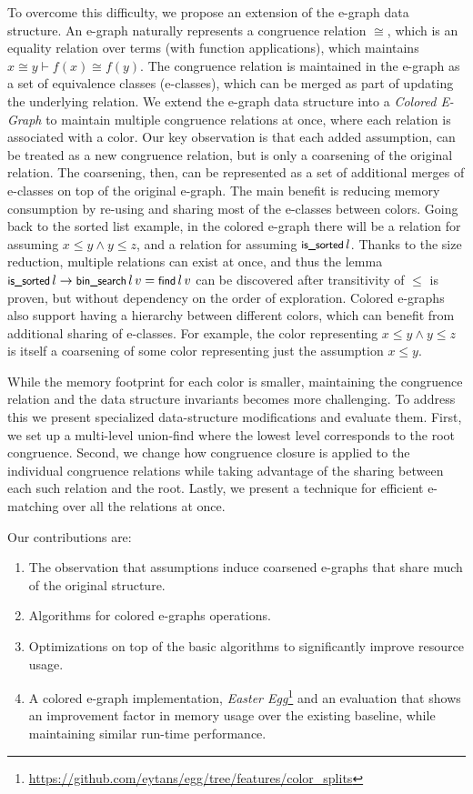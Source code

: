 To overcome this difficulty, we propose an extension of the e-graph data structure.
An e-graph naturally represents a congruence relation $\cong$, which is an equality relation over terms (with function applications), which  maintains $x \cong y \vdash f(x) \cong f(y)$.
The congruence relation is maintained in the e-graph as a set of equivalence classes (e-classes), which can be merged as part of updating the underlying relation. 
We extend the e-graph data structure into a \emph{Colored E-Graph} to maintain multiple congruence relations at once, where each relation is associated with a color.
Our key observation is that each added assumption, can be treated as a new congruence relation, but is only a coarsening of the original relation. 
The coarsening, then, can be represented as a set of additional merges of e-classes on top of the original e-graph.
The main benefit is reducing memory consumption by re-using and sharing most of the e-classes between colors.
Going back to the sorted list example, in the colored e-graph there will be a \cred relation for assuming $x \le y \land y \le z$, and a \cblue relation for assuming $\tissorted\,l$.
Thanks to the size reduction, multiple relations can exist at once, and thus the lemma $\tissorted\,l \rightarrow \tbinsearch\, l\,v = \tlfind\,l\,v$ can be discovered after transitivity of $\leq$ is proven, but without dependency on the order of exploration.
Colored e-graphs also support having a hierarchy between different colors, which can benefit from additional sharing of e-classes.
For example, the \cred color representing $x \le y \land y \le z$ is itself a coarsening of some \cgreen color representing just the assumption $x \le y$.

While the memory footprint for each color is smaller, maintaining the congruence relation and the data structure invariants becomes more challenging.
To address this we present specialized data-structure modifications and evaluate them.
First, we set up a multi-level union-find where the lowest level corresponds to the root congruence.
Second, we change how congruence closure is applied to the individual congruence relations while taking advantage of the sharing between each such relation and the root. 
Lastly, we present a technique for efficient e-matching over all the relations at once.

\medskip
Our contributions are:
\begin{enumerate}[leftmargin=1.1em]
    \item The observation that assumptions induce coarsened e-graphs that share much of the original structure. 
    \item Algorithms for colored e-graphs operations.
    \item Optimizations on top of the basic algorithms to significantly improve resource usage.
    \item A colored e-graph implementation, \emph{Easter Egg}\footnote{\url{https://github.com/eytans/egg/tree/features/color_splits}} and an evaluation that shows an improvement factor in memory usage over the existing baseline, while maintaining similar run-time performance.
\end{enumerate}